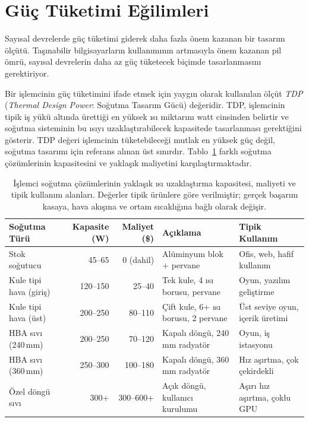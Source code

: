 \section{Güç Tüketimi Eğilimleri}
\label{sec:guc-tuketimi}

Sayısal devrelerde güç tüketimi giderek daha fazla önem kazanan bir tasarım ölçütü. Taşınabilir bilgisayarların kullanımının artmasıyla önem kazanan pil ömrü, sayısal devrelerin daha az güç tüketecek biçimde tasarlanmasını gerektiriyor.

Bir işlemcinin güç tüketimini ifade etmek için yaygın olarak kullanılan ölçüt \emph{TDP} (\emph{Thermal Design Power}: Soğutma Tasarım Gücü) değeridir. TDP, işlemcinin tipik iş yükü altında ürettiği en yüksek ısı miktarını watt cinsinden belirtir ve soğutma sisteminin bu ısıyı uzaklaştırabilecek kapasitede tasarlanması gerektiğini gösterir. TDP değeri işlemcinin tüketebileceği mutlak en yüksek güç değil, soğutma tasarımı için referans alınan üst sınırdır. Tablo~\ref{tab:sogutma-sistemleri} farklı soğutma çözümlerinin kapasitesini ve yaklaşık maliyetini karşılaştırmaktadır.

\begin{table}[ht!]
\centering
\caption[Soğutma çözümlerinin TDP kapasitesi ve maliyeti]{İşlemci soğutma çözümlerinin yaklaşık ısı uzaklaştırma kapasitesi, maliyeti ve tipik kullanım alanları. Değerler tipik ürünlere göre verilmiştir; gerçek başarım kasaya, hava akışına ve ortam sıcaklığına bağlı olarak değişir.}
\label{tab:sogutma-sistemleri}
\footnotesize
\begin{tabular}{lrrp{3.6cm}p{3.2cm}}
\toprule
\textbf{Soğutma Türü} & \textbf{Kapasite (W)} & \textbf{Maliyet (\$)} & \textbf{Açıklama} & \textbf{Tipik Kullanım} \\
\midrule
Stok soğutucu          & 45--65    & 0 (dahil)    & Alüminyum blok + pervane & Ofis, web, hafif kullanım \\
Kule tipi hava (giriş) & 120--150  & 25--40       & Tek kule, 4 ısı borusu, pervane & Oyun, yazılım geliştirme \\
Kule tipi hava (üst)   & 200--250  & 80--110      & Çift kule, 6+ ısı borusu, 2 pervane & Üst seviye oyun, içerik üretimi \\
HBA sıvı (240\,mm)     & 200--250  & 70--120      & Kapalı döngü, 240\,mm radyatör & Oyun, iş istasyonu \\
HBA sıvı (360\,mm)     & 250--300  & 100--180     & Kapalı döngü, 360\,mm radyatör & Hız aşırtma, çok çekirdekli \\
Özel döngü sıvı        & 300+      & 300--600+    & Açık döngü, kullanıcı kurulumu & Aşırı hız aşırtma, çoklu GPU \\
\bottomrule
\end{tabular}
\end{table}

